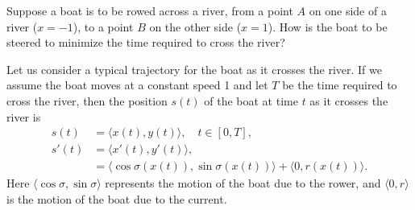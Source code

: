 \label{lab:rivercrossing}

Suppose a boat is to be rowed across a river, from a point $A$ on one side of a river ($x=-1$), to a point $B$ on the other side ($x=1$). 
How is the boat to be steered to minimize the time required to cross the river? 

Let us consider a typical trajectory for the boat as it crosses the river. 
If we assume the boat moves at a constant speed 1 and let $T$ be the time required to cross the river, then the position $s(t)$ of the boat at time $t$ as it crosses the river is
\begin{align*}
	s(t) &= \langle x(t), y(t) \rangle, \quad t \in [0,T], \\
	s'(t) &= \langle x'(t), y'(t) \rangle, \\
	&= \langle \cos \sigma(x(t)),\sin \sigma(x(t)) \rangle + \langle 0, r(x(t)) \rangle.
\end{align*}
Here $\langle \cos \sigma, \sin \sigma \rangle$ represents the motion of the boat due to the rower, and $\langle 0, r \rangle$ is the motion of the boat due to the current.

